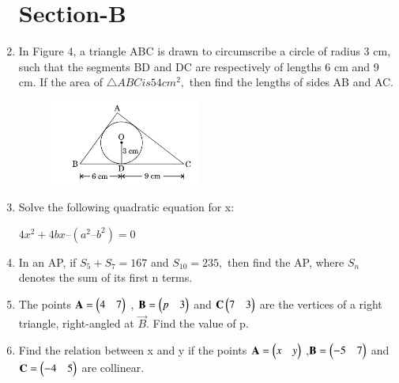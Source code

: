 \documentclass[journal,12pt,twocolumn]{IEEEtran}
\begin{document}
\begin{enumerate}
\section{Section-B}
\item In Figure 4, a triangle ABC is drawn to circumscribe a circle of radius 3 cm, such that the segments BD and DC are respectively of lengths 6 cm  and 9 cm. If the area of $\triangle ABC is 54 cm^2,$ then find the lengths of sides AB and AC.
\begin{figure}[h!]
    \centering
    \includegraphics[width=5cm]{image4.png}
 \end{figure}
 \item Solve the following quadratic equation for x:
 \begin{center}
     $ 4x^2 + 4bx – (a^2–b^2) = 0 $
 \end{center}
 \item In an AP, if $ S_5 + S_7 = 167 $ and $S_{10}= 235,$ then find the AP, where $ S_n $ denotes the sum of its first n terms.
 \item The points $ \mathbf{A}= \begin{pmatrix}4 & 7\end{pmatrix} $ , $ \mathbf{B}=\begin{pmatrix}p & 3\end{pmatrix} $ and $ \mathbf{C}\begin{pmatrix}7 & 3\end{pmatrix} $ are the vertices of a right triangle, right-angled at $ \vec{B} $. Find the value of p.
 \item Find the relation between x and y if the points $ \mathbf{A}=\begin{pmatrix}x & y\end{pmatrix}$ ,$ \mathbf{B}=\begin{pmatrix}-5&7\end{pmatrix} $ and $ \mathbf{C}=\begin{pmatrix}-4&5\end{pmatrix}$ are collinear.

\end{enumerate}
\end{document}
